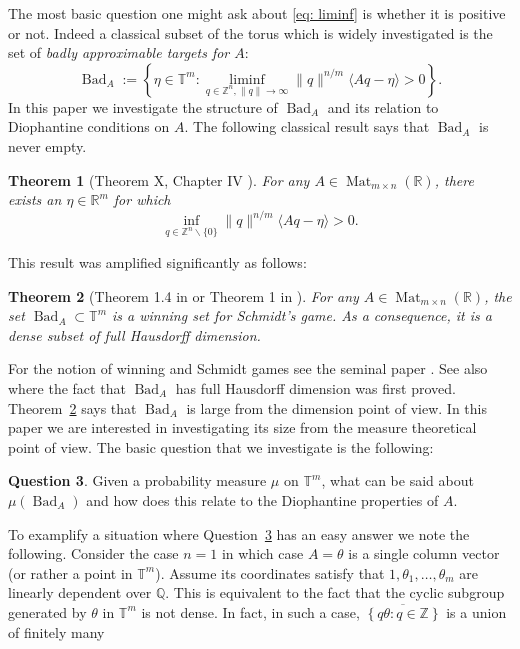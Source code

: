 \documentclass[reqno,11pt, twoside]{amsart}
\theoremstyle{plain}
\newtheorem{thm}{Theorem}[section]
\theoremstyle{definition}
\newtheorem{ques}[thm]{Question}
\theoremstyle{definition}
\theoremstyle{remark}
\numberwithin{equation}{section}
\newcommand{\R}{{\mathbb{R}}}
\newcommand{\Z}{{\mathbb{Z}}}
\newcommand{\bR}{\mathbb{R}}
\newcommand{\bZ}{\mathbb{Z}}
\newcommand{\bQ}{\mathbb{Q}}
\newcommand{\bT}{\mathbb{T}}
\newcommand\norm[1]{\|#1\|}
\newcommand\seta[1]{\left\{#1\right\}}
\newcommand\idist[1]{\langle#1\rangle}
\newcommand\on[1]{\operatorname{#1}}
\begin{document}
The most basic question one might ask about \eqref{eq: liminf} is whether it is positive or not. Indeed a classical subset of the torus which is widely investigated is the set of \textit{badly approximable targets for $A$}:  
\begin{equation}
    \label{eq: BadA}
    \on{Bad}_A := \seta{\eta\in \bT^m: \liminf_{q\in \bZ^n, \norm{q}\to\infty} \norm{q}^{n/m}\idist{Aq -\eta} >0}.
\end{equation}
In this paper we investigate the structure of $\on{Bad}_A$ and its relation to Diophantine conditions on $A$. The following classical result says that $\on{Bad}_A$ is never empty. 
\begin{thm}[Theorem X, Chapter IV \cite{CasselsDA}]
\label{thm: Bad non empty}
    For any $A \in \on{Mat}_{m\times n}(\bR)$, there exists an $\eta \in \R^m$ for which
    \begin{equation}\label{eq: liminf >0}
        \inf_{q \in \Z^n \smallsetminus \{0\}} \norm{q}^{n/m} \langle Aq - \eta \rangle >0.
    \end{equation}
\end{thm}
This result was amplified significantly as follows:
\begin{thm}[Theorem 1.4 in \cite{ETcrelle} or Theorem 1 in \cite{Moshchevitin-badforms}]\label{thm: Bad is winning}
    For any $A\in \on{Mat}_{m\times n}(\bR)$, the set $\on{Bad}_A\subset \bT^m$ is a winning set for Schmidt's game. As a consequence, it is a dense subset of full Hausdorff dimension.
\end{thm}
For the notion of winning and Schmidt games see the seminal paper \cite{Schmidt-games}.
See also \cite{BHKV} where the fact that $\on{Bad}_A$ has full Hausdorff dimension was first proved.
Theorem~\ref{thm: Bad is winning} says that $\on{Bad}_A$ is large from the dimension point of view. In this paper we are interested in investigating its size from the measure theoretical point of view. The basic question that 
we investigate is the following:
\begin{ques}\label{ques: main}
    Given a probability measure $\mu$ on $\bT^m$, what can be said about 
    $\mu(\on{Bad}_A)$ and how does this relate to the Diophantine properties of $A.$
\end{ques}
To examplify a situation where Question~\ref{ques: main} has an easy answer we note the following. Consider the case $n=1$ in which case $A=\theta$ is a single column vector (or rather a point in $\bT^m$). Assume its coordinates satisfy that $1,\theta_1,\dots,\theta_m$ are linearly dependent over $\bQ$. This is equivalent to the fact that the cyclic subgroup generated by $\theta$ in $\bT^m$ is not dense. In fact, in such a case, $\overline{\seta{q\theta:q\in \bZ}}$ is a union of finitely many 
\end{document}
